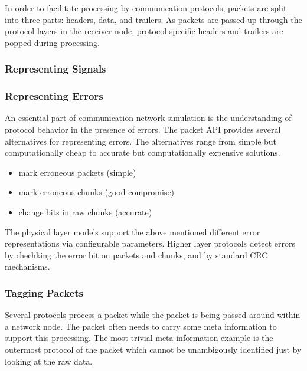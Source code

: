 
In order to facilitate processing by communication protocols, packets are split into three parts: headers, data, and trailers. As packets are passed up through the protocol layers in the receiver node, protocol specific headers and trailers are popped during processing.


\subsubsection*{Representing Signals}
%


\subsubsection*{Representing Errors}
%
An essential part of communication network simulation is the understanding of protocol behavior in the presence of errors. The packet API provides several alternatives for representing errors. The alternatives range from simple but computationally cheap to accurate but computationally expensive solutions.

\begin{itemize}
	\item	mark erroneous packets (simple)
        \item   mark erroneous chunks (good compromise)
        \item   change bits in raw chunks (accurate)
\end{itemize}


The physical layer models support the above mentioned different error representations via configurable parameters. Higher layer protocols detect errors by chechking the error bit on packets and chunks, and by standard CRC mechanisms.

%
\subsubsection*{Tagging Packets}
%
Several protocols process a packet while the packet is being passed around within a network node. The packet often needs to carry some meta information to support this processing. The most trivial meta information example is the outermost protocol of the packet which cannot be unambigously identified just by looking at the raw data.

